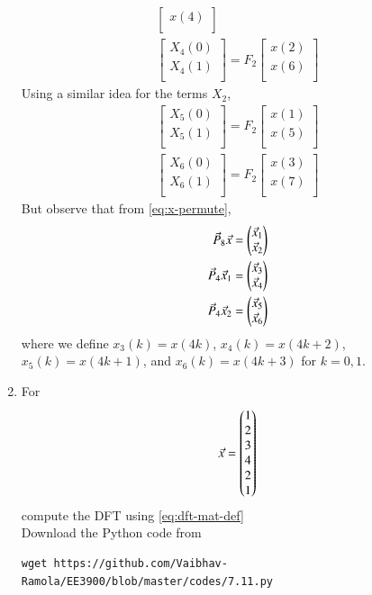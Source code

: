 \documentclass[journal,12pt,twocolumn]{IEEEtran}
\renewcommand\thesection{\arabic{section}}
\begin{document}
\begin{enumerate}[label=\thesection.\arabic*]
\begin{align}
\begin{bmatrix}
		x(4) \\ 
	\end{bmatrix} \\
	\begin{bmatrix}
		X_{4}(0) \\ 
		X_{4}(1)\\ 
	\end{bmatrix}
	= F_{2}
	\begin{bmatrix}
		x(2) \\ 
		x(6) \\ 
	\end{bmatrix}
\end{align}
Using a similar idea for the terms $X_2$, 
\begin{align}
	\begin{bmatrix}
		X_{5}(0) \\ 
		X_{5}(1)\\ 
	\end{bmatrix}
	= F_{2}
	\begin{bmatrix}
		x(1) \\ 
		x(5) \\ 
	\end{bmatrix} \\
	\begin{bmatrix}
		X_{6}(0) \\ 
		X_{6}(1)\\ 
	\end{bmatrix}
	= F_{2}
	\begin{bmatrix}
		x(3) \\ 
		x(7) \\ 
	\end{bmatrix}
\end{align}
But observe that from \eqref{eq:x-permute},
\begin{align}
	\vec{P}_8\vec{x} &= \begin{pmatrix}\vec{x}_1\\\vec{x}_2\end{pmatrix} \\
	\vec{P}_4\vec{x}_1 &= \begin{pmatrix}\vec{x}_3\\\vec{x}_4\end{pmatrix} \\ 
	\vec{P}_4\vec{x}_2 &= \begin{pmatrix}\vec{x}_5\\\vec{x}_6\end{pmatrix}
\end{align}
where we define $x_3(k) = x(4k)$, $x_4(k) = x(4k + 2)$, $x_5(k) = x(4k + 1)$, and $x_6(k) = x(4k + 3)$ for $k = 0, 1$.
\item For 
\begin{align}
	\vec{x} = \begin{pmatrix}1\\2\\3\\4\\2\\1\end{pmatrix}
	\label{eq:equation1}
\end{align}
compute the DFT  
using 
\eqref{eq:dft-mat-def}
\\
\solution Download the Python code from 
\begin{lstlisting}
wget https://github.com/Vaibhav-Ramola/EE3900/blob/master/codes/7.11.py
\end{lstlisting}


\end{enumerate}
\end{document}
